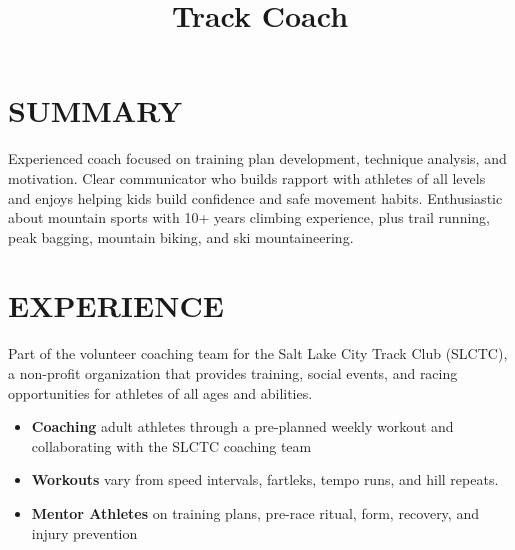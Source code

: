 \documentclass[resmargin, centered, 10pt]{../res}
\begin{document}
\address{\href{mailto:kirkwood.donavin@gmail.com}{Kirkwood.Donavin@Gmail.com}}
\address{+1 (801) 554-6834}
\address{}
\address{}
\address{}

\begin{resume}
    
\fullline

\section{SUMMARY}

Experienced coach focused on training plan development, technique analysis, and motivation. Clear communicator who builds rapport with athletes of all levels and enjoys helping kids build confidence and safe movement habits. Enthusiastic about mountain sports with 10+ years climbing experience, plus trail running, peak bagging, mountain biking, and ski mountaineering.

\fullline

\section{EXPERIENCE}

\title{Track Coach}
\begin{position}
	Part of the volunteer coaching team for the Salt Lake City Track Club (SLCTC), a non-profit organization that provides training, social events, and racing opportunities for athletes of all ages and abilities. \\
	\begin{itemize}
		\item \textbf{Coaching} adult athletes through a pre-planned weekly workout and collaborating with the SLCTC coaching team
		\item \textbf{Workouts} vary from speed intervals, fartleks, tempo runs, and hill repeats.
		\item \textbf{Mentor Athletes} on training plans, pre-race ritual, form, recovery, and injury prevention
	\end{itemize}
\end{position}


\end{resume}
\end{document}
